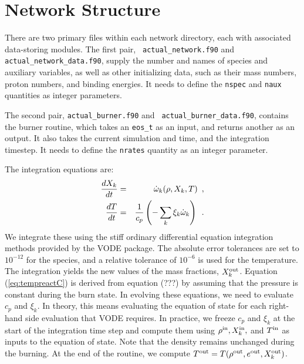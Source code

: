 \section{Network Structure}

There are two primary files within each network directory, each with
associated data-storing modules. The first pair, {\tt
  actual\_network.f90} and {\tt actual\_network\_data.f90}, supply the
number and names of species and auxiliary variables, as well as other
initializing data, such as their mass numbers, proton numbers, and
binding energies. It needs to define the {\tt nspec} and {\tt naux}
quantities as integer parameters.

The second pair, {\tt actual\_burner.f90} and {\tt
  actual\_burner\_data.f90}, contains the burner routine, which takes
an {\tt eos\_t} as an input, and returns another as an output. It also
takes the current simulation and time, and the integration
timestep. It needs to define the {\tt nrates} quantity as an integer
parameter.

The integration equations are:
\begin{eqnarray}
\frac{dX_k}{dt} &=& \dot{\omega}_k(\rho,X_k,T)\enskip, \label{eq:VODE1C} \\
\frac{dT}{dt} &=&\frac{1}{c_p} \left ( -\sum_k \xi_k  \dot{\omega}_k  \right )\enskip. \label{eq:tempreactC}
\end{eqnarray}
We integrate these using the stiff ordinary differential equation
integration methods provided by the VODE package.  The absolute error
tolerances are set to $10^{-12}$ for the species, and a relative
tolerance of $10^{-6}$ is used for the temperature.  The integration
yields the new values of the mass fractions, $X_k^{\mathrm{out}}$.  Equation
(\ref{eq:tempreactC}) is derived from equation (???) by assuming that
the pressure is constant during the burn state.  In evolving these
equations, we need to evaluate $c_p$ and $\xi_k$.  In theory, this
means evaluating the equation of state for each right-hand side
evaluation that VODE requires.  In practice, we freeze $c_p$ and
$\xi_k$ at the start of the integration time step and compute them
using $\rho^{\mathrm{in}}, X_k^{\mathrm{in}},$ and $T^{\mathrm{in}}$ as inputs to the equation of
state.  Note that the density remains unchanged during the burning.
At the end of the routine, we compute $T^{\mathrm{out}} =
T(\rho^{\mathrm{out}},e^{\mathrm{out}},X_k^{\mathrm{out}})$.
